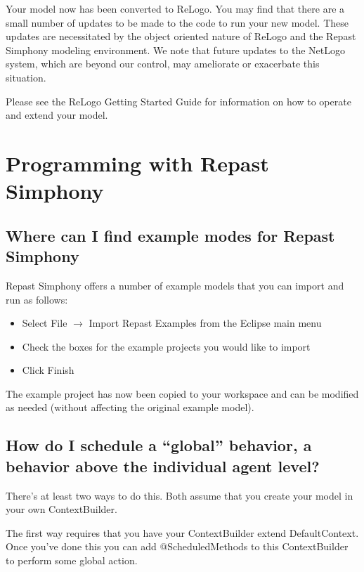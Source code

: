 \documentclass[11pt]{article}
\begin{document}
Your model now has been converted to ReLogo. You may find that there are a small number of updates to be made to the code to run your new model. These updates are necessitated by the object oriented nature of ReLogo and the Repast Simphony modeling environment. We note that future updates to the NetLogo system, which are beyond our control, may ameliorate or exacerbate this situation.

Please see the ReLogo Getting Started Guide for information on how to operate and extend your model.
\section{Programming with Repast Simphony}

\subsection{Where can I find example modes for Repast Simphony}
\label{prs:examples}
Repast Simphony offers a number of example models that you can import and run as follows:
\begin{itemize}
\item Select File $\rightarrow$ Import Repast Examples from the Eclipse main menu
\item Check the boxes for the example projects you would like to import
\item Click Finish
\end{itemize}

The example project has now been copied to your workspace and can be modified as needed (without affecting the original example model).

\subsection{How do I schedule a ``global'' behavior, a behavior above the individual agent level?}
\label{prs:schedule_global}

There's at least two ways to do this. Both assume that you create your model in your own ContextBuilder.

The first way requires that you have your ContextBuilder extend DefaultContext. Once you've done this you can add @ScheduledMethods to this ContextBuilder to perform some global action.
\end{document}

